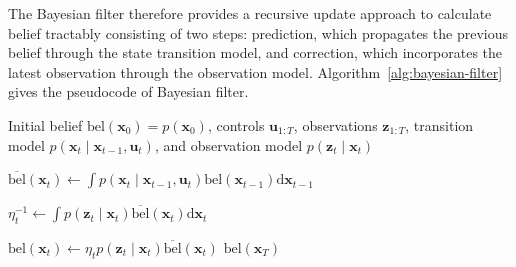 \documentclass[../Bayesian_Inference.tex]{subfiles}
\begin{document}
The Bayesian filter therefore provides a recursive update approach to calculate belief tractably consisting of two steps: prediction, which propagates the previous belief through the state transition model, and correction, which incorporates the latest observation through the observation model. Algorithm~\ref{alg:bayesian-filter} gives the pseudocode of Bayesian filter.

\begin{algorithm}[H]
    \caption{Bayesian Filter}
    \label{alg:bayesian-filter}
    \begin{algorithmic}[1]

    \Require Initial belief $\mathrm{bel}(\bm{x}_0)=p(\bm{x}_0)$, controls $\bm{u}_{1:T}$, observations $\bm{z}_{1:T}$, transition model $p(\bm{x}_t\mid\bm{x}_{t-1},\bm{u}_t)$, and observation model $p(\bm{z}_t\mid\bm{x}_t)$ 

        \State 
        $ \overline{\mathrm{bel}}(\bm{x}_t) \gets\displaystyle\int p(\bm{x}_t\mid\bm{x}_{t-1},\bm{u}_t) \mathrm{bel}(\bm{x}_{t-1}) \mathrm{d}\bm{x}_{t-1} $

        \State 
        $ \eta_t^{-1} \gets  \int p(\bm{z}_t\mid\bm{x}_t) \overline{\mathrm{bel}}(\bm{x}_t) \mathrm{d}\bm{x}_t $ 

        \State 
        $ \mathrm{bel}(\bm{x}_t) \gets \eta_t p(\bm{z}_t\mid\bm{x}_t) \overline{\mathrm{bel}}(\bm{x}_t) $ 
    \EndFor
    \State \Return $\mathrm{bel}(\bm{x}_T)$
    \end{algorithmic}
\end{algorithm}
\end{document}
